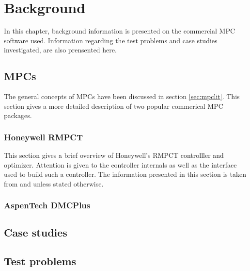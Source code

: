 \chapter{Background}\label{chap:background}
\begin{overview}
  In this chapter, background information is presented on the commercial
  MPC software used. Information regarding the test problems and case studies
  investigated, are also prensented here.
\end{overview}

\section{MPCs}
The general concepts of MPCs have been discussed in section \ref{sec:mpclit}.
This section gives a more detailed description of two popular commerical MPC
packages.
\subsection{Honeywell RMPCT}
This section gives a brief overview of Honeywell's RMPCT controlller and
optimizer. Attention is given to the controller internals as well as the
interface used to build such a controller. The information presented in this
section is taken from \citet{honeywell1} and \citet{honeywell2} unless stated 
otherwise.
\subsection{AspenTech DMCPlus}

\section{Case studies}

\section{Test problems}